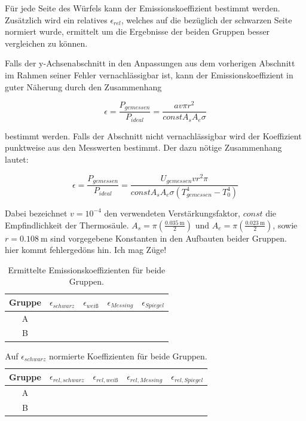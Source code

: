 \documentclass[12pt,a4paper]{article}
\begin{document}
Für jede Seite des Würfels kann der Emissionskoeffizient bestimmt werden. Zusätzlich wird ein relatives $\epsilon_{rel}$, welches auf die bezüglich der schwarzen Seite normiert wurde, ermittelt um die Ergebnisse der beiden Gruppen besser vergleichen zu können.

Falls der y-Achsenabschnitt in den Anpassungen aus dem vorherigen Abschnitt im Rahmen seiner Fehler vernachlässigbar ist, kann der Emissionskoeffizient in guter Näherung durch den Zusammenhang

\begin{equation}
\epsilon = \frac{P_{gemessen}}{P_{ideal}} = \frac{a v \pi r^2}{const A_s A_e \sigma}
\end{equation}

bestimmt werden. Falls der Abschnitt nicht vernachlässigbar wird 
der Koeffizient punktweise aus den Messwerten bestimmt. Der dazu nötige Zusammenhang lautet:

\begin{equation}
\epsilon = \frac{P_{gemessen}}{P_{ideal}} = \frac{U_{gemessen}vr^2 \pi}{const A_s A_e \sigma (T_{gemessen}^4-T_0^4)}
\end{equation}

Dabei bezeichnet $v = 10^{-4}$ den verwendeten Verstärkungsfaktor, $const$ die Empfindlichkeit der Thermosäule. $A_s = \pi \left(\frac{\SI{0,035}{\m}}{2}\right)$ und $A_e = \pi \left(\frac{\SI{0,023}{\m}}{2}\right)$, sowie $r = \SI{0,108}{\m}$ sind vorgegebene Konstanten in den Aufbauten beider Gruppen.\\

hier kommt fehlergedöns hin. Ich mag Züge!


\begin{table}
\centering
\begin{tabular}{|c|c|c|c|c|}
\hline
Gruppe & $\epsilon_{schwarz}$ & $\epsilon_{weiß}$ & $\epsilon_{Messing}$ & $\epsilon_{Spiegel}$ \\
\hline
A & & & & \\
\hline
B & & & & \\
\hline
\end{tabular}
\caption{Ermittelte Emissionskoeffizienten für beide Gruppen.}
\label{tab:Emission}
\end{table}

\begin{table}
\centering
\begin{tabular}{|c|c|c|c|c|}
\hline
Gruppe & $\epsilon_{rel,schwarz}$ & $\epsilon_{rel,weiß}$ & $\epsilon_{rel,Messing}$ & $\epsilon_{rel,Spiegel}$ \\
\hline
A & & & & \\
\hline
B & & & & \\
\hline
\end{tabular}
\caption{Auf $\epsilon_{schwarz}$ normierte Koeffizienten für beide Gruppen.}
\label{tab:Emission_relativ}
\end{table}
\end{document}
